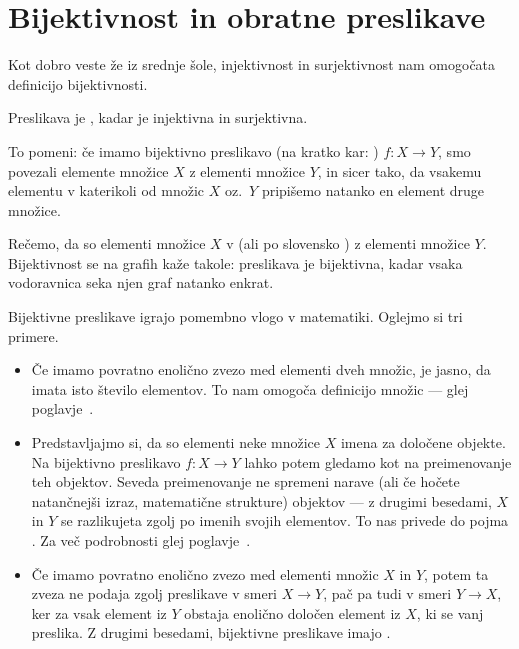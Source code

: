 

\section{Bijektivnost in obratne preslikave}\label{razdelek:bijektivnost-in-obratne-preslikave}

Kot dobro veste že iz srednje šole, injektivnost in surjektivnost nam omogočata definicijo bijektivnosti.

\begin{definicija}
Preslikava je , kadar je injektivna in surjektivna.
\end{definicija}

To pomeni: če imamo bijektivno preslikavo (na kratko kar: ) $f\colon X \to Y$, smo povezali elemente množice $X$ z elementi množice $Y$, in sicer tako, da vsakemu elementu v katerikoli od množic $X$ oz.~$Y$ pripišemo natanko en element druge množice.


Rečemo, da so elementi množice $X$ v  (ali po slovensko ) z elementi množice $Y$. Bijektivnost se na grafih kaže takole: preslikava je bijektivna, kadar vsaka vodoravnica seka njen graf natanko enkrat.

Bijektivne preslikave igrajo pomembno vlogo v matematiki. Oglejmo si tri primere.
\begin{itemize}
\item
Če imamo povratno enolično zvezo med elementi dveh množic, je jasno, da imata isto število elementov. To nam omogoča definicijo  množic --- glej poglavje~.
\item
Predstavljajmo si, da so elementi neke množice $X$ imena za določene objekte. Na bijektivno preslikavo $f\colon X \to Y$ lahko potem gledamo kot na preimenovanje teh objektov. Seveda preimenovanje ne spremeni narave (ali če hočete natančnejši izraz, matematične strukture) objektov --- z drugimi besedami, $X$ in $Y$ se razlikujeta zgolj po imenih svojih elementov. To nas privede do pojma . Za več podrobnosti glej poglavje~.
\item
Če imamo povratno enolično zvezo med elementi množic $X$ in $Y$, potem ta zveza ne podaja zgolj preslikave v smeri $X \to Y$, pač pa tudi v smeri $Y \to X$, ker za vsak element iz $Y$ obstaja enolično določen element iz $X$, ki se vanj preslika. Z drugimi besedami, bijektivne preslikave imajo .
\end{itemize}

